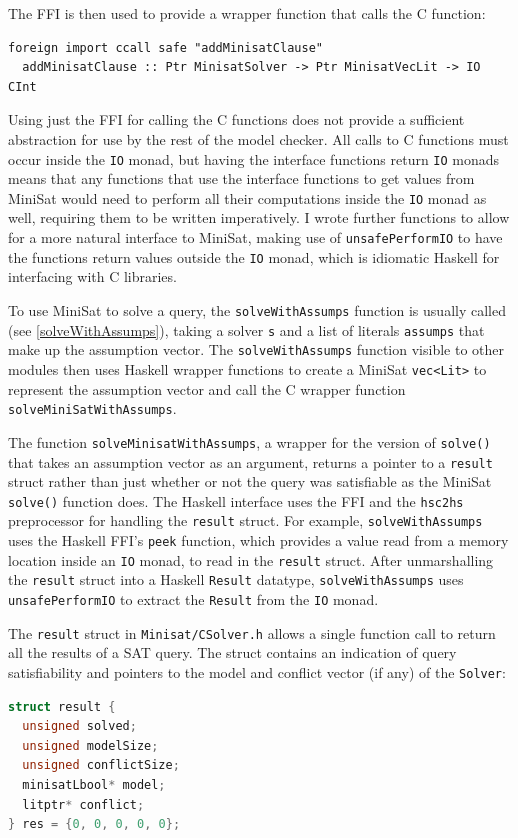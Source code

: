 \documentclass[12pt,a4paper,twoside,openright]{report}
\begin{document}
{{The FFI is then used to provide a wrapper function that calls
the C function:
\begin{lstlisting}
foreign import ccall safe "addMinisatClause"
  addMinisatClause :: Ptr MinisatSolver -> Ptr MinisatVecLit -> IO CInt
\end{lstlisting}

Using just the FFI for calling the C functions does not provide a
sufficient abstraction for use by the rest of the model checker. All
calls to C functions must occur inside the \verb,IO, monad, but having
the interface functions return \verb,IO, monads means that any functions
that use the interface functions to get values from MiniSat would need to
perform all their computations inside the \verb,IO, monad as well, requiring them to
be written imperatively.
I wrote further functions to allow for a more natural interface to MiniSat,
making use of \verb,unsafePerformIO, to have the functions return
values outside the \verb,IO, monad, which is idiomatic Haskell for
interfacing with C libraries.

To use MiniSat to solve a query, the \verb,solveWithAssumps, function
is usually called (see \ref{solveWithAssumps}),
taking a solver \verb,s, and a list of literals \verb,assumps,
that make up the assumption vector. The \verb,solveWithAssumps, function
visible to other modules then uses Haskell wrapper functions to create
a MiniSat \verb,vec<Lit>, to represent the assumption vector and call
the C wrapper function \verb,solveMiniSatWithAssumps,.

The function \verb,solveMinisatWithAssumps,, a wrapper for the version of \verb,solve(),
that takes an assumption vector as an argument, returns a pointer to a
\verb,result, struct rather than just whether or not the query was satisfiable
as the MiniSat \verb,solve(), function does.
The Haskell interface uses the FFI and the \verb,hsc2hs, preprocessor
for handling the \verb,result, struct. For example, \verb,solveWithAssumps,
uses the Haskell FFI's \verb,peek, function,
which provides a value read from a memory location inside
an \verb,IO, monad, to read in the \verb,result, struct. After unmarshalling
the \verb,result, struct into a Haskell \verb,Result, datatype, \verb,solveWithAssumps,
uses \verb,unsafePerformIO, to extract the \verb,Result, from the \verb,IO, monad.

The \verb,result, struct in \verb,Minisat/CSolver.h,
allows a single function call to return
all the results of a SAT query. The struct contains an indication of query satisfiability
and pointers to the model and conflict vector (if any) of the \verb,Solver,:
\begin{lstlisting}[language=C]
struct result {
  unsigned solved;
  unsigned modelSize;
  unsigned conflictSize;
  minisatLbool* model;
  litptr* conflict;
} res = {0, 0, 0, 0, 0};
\end{lstlisting}

}}
\end{document}
